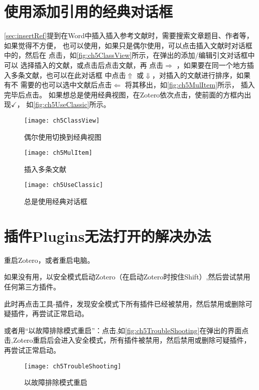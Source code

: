 \documentclass[theorem=false,mathfont=none,openany,sub3section]{easybook}
\begin{document}
{\section{使用添加引用的经典对话框} \label{sec:classView}				
\cref{sec:insertRef}提到在Word中插入插入参考文献时，需要搜索文章题目、作者等，如果觉得不方便，
也可以使用，如果只是偶尔使用，可以点击插入文献时对话框中的，然后在
点击，如\autoref{fig:ch5ClassView}所示，在弹出的添加/编辑引文对话框中可以
选择插入的文献，或点击后点击文献，再
点击$\Rightarrow$ ，如果要在同一个地方插入多条文献，也可以在此对话框
中点击$\Uparrow$ 或$\Downarrow$，对插入的文献进行排序，如果有不
需要的也可以选中文献后点击$\Leftarrow$ 将其移出，如\autoref{fig:ch5MulItem}所示，
插入完毕后点击。
如果想总是使用经典视图，在Zotero依次点击，使前面的方框内出现$\checkmark$，
如\autoref{fig:ch5UseClassic}所示。
	\begin{figure}[htbp]
		\centering
		\texttt{[image: ch5ClassView]}
		\caption{偶尔使用切换到经典视图}
		\label{fig:ch5ClassView}
	\end{figure}
	\begin{figure}[htbp]
		\centering
		\texttt{[image: ch5MulItem]}
		\caption{插入多条文献}
		\label{fig:ch5MulItem}
	\end{figure}
	\begin{figure}[htbp]
		\centering
		\texttt{[image: ch5UseClassic]}
		\caption{总是使用经典对话框}
		\label{fig:ch5UseClassic}
	\end{figure}

\section{插件Plugins无法打开的解决办法} \label{sec:plugin_no_open}
重启Zotero，或者重启电脑。

如果没有用，以安全模式启动Zotero（在启动Zotero时按住Shift）,然后尝试禁用任何第三方插件。

此时再点击工具-插件，发现安全模式下所有插件已经被禁用，然后禁用或删除可疑插件，再尝试正常启动。

或者用“以故障排除模式重启”：点击,如\autoref{fig:ch5TroubleShooting}在弹出的界面点击,Zotero重启后会进入安全模式，所有插件被禁用，然后禁用或删除可疑插件，再尝试正常启动。
	\begin{figure}[htbp]
		\centering
		\texttt{[image: ch5TroubleShooting]}
		\caption{以故障排除模式重启}
		\label{fig:ch5TroubleShooting}
	\end{figure}

}
\end{document}
